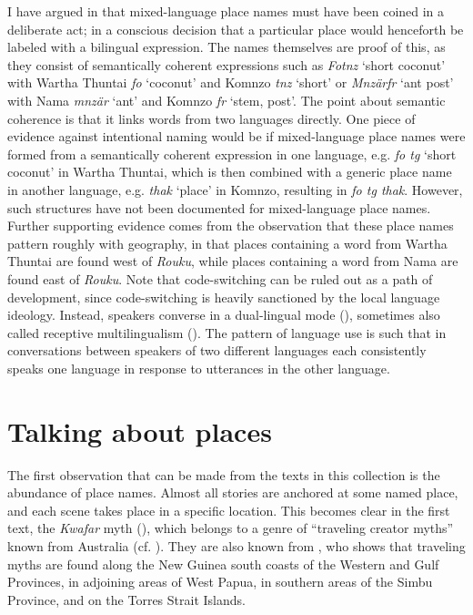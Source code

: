 I have argued in \citet{Dohler:2021tb} that mixed-language place names must have been coined in a deliberate act; in a conscious decision that a particular place would henceforth be labeled with a bilingual expression. The names themselves are proof of this, as they consist of semantically coherent expressions such as \textit{Fotnz} `short coconut' with Wartha Thuntai \textit{fo} `coconut' and Komnzo \textit{tnz} `short' or \textit{Mnzärfr} `ant post' with Nama \textit{mnzär} `ant' and Komnzo \textit{fr} `stem, post'. The point about semantic coherence is that it links words from two languages directly. One piece of evidence against intentional naming would be if mixed-language place names were formed from a semantically coherent expression in one language, e.g. \textit{fo tg} `short coconut' in Wartha Thuntai, which is then combined with a generic place name in another language, e.g. \textit{thak} `place' in Komnzo, resulting in \textit{fo tg thak}. However, such structures have not been documented for mixed-language place names. Further supporting evidence comes from the observation that these place names pattern roughly with geography, in that places containing a word from Wartha Thuntai are found west of \textit{Rouku}, while places containing a word from Nama are found east of \textit{Rouku}. Note that code-switching can be ruled out as a path of development, since code-switching is heavily sanctioned by the local language ideology. Instead, speakers converse in a dual-lingual mode (\cite{Lincoln:1976sl}), sometimes also called receptive multilingualism (\cite{Singer:2023zj}). The pattern of language use is such that in conversations between speakers of two different languages each consistently speaks one language in response to utterances in the other language.

\section{Talking about places}\label{talkingplaces}
The first observation that can be made from the texts in this collection is the abundance of place names. Almost all stories are anchored at some named place, and each scene takes place in a specific location. This becomes clear in the first text, the \textit{Kwafar} myth (), which belongs to a genre of ``traveling creator myths'' known from Australia (cf. \cite[5ff.]{Evans:2010vh}). They are also known from \textcite{Wagner:1996qz}, who shows that traveling myths are found along the New Guinea south coasts of the Western and Gulf Provinces, in adjoining areas of West Papua, in southern areas of the Simbu Province, and on the Torres Strait Islands.

